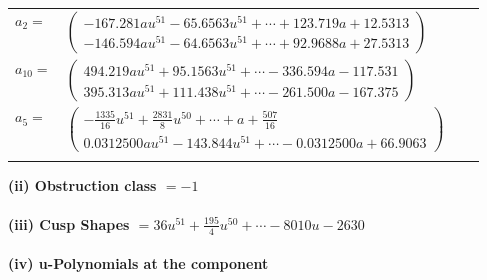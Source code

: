 \documentclass[1p]{elsarticle_modified}
\theoremstyle{definition}
\begin{document}
\begin{tabular}{m{7pt} m{180pt} m{7pt} m{180pt} }
\flushright $a_{2}=$&$\begin{pmatrix}-167.281 a u^{51}-65.6563 u^{51}+\cdots+123.719 a+12.5313\\-146.594 a u^{51}-64.6563 u^{51}+\cdots+92.9688 a+27.5313\end{pmatrix}$ \\
\flushright $a_{10}=$&$\begin{pmatrix}494.219 a u^{51}+95.1563 u^{51}+\cdots-336.594 a-117.531\\395.313 a u^{51}+111.438 u^{51}+\cdots-261.500 a-167.375\end{pmatrix}$ \\
\flushright $a_{5}=$&$\begin{pmatrix}-\frac{1335}{16} u^{51}+\frac{2831}{8} u^{50}+\cdots+a+\frac{507}{16}\\0.0312500 a u^{51}-143.844 u^{51}+\cdots-0.0312500 a+66.9063\end{pmatrix}$\\&\end{tabular}
\flushleft \textbf{(ii) Obstruction class $= -1$}\\~\\
\flushleft \textbf{(iii) Cusp Shapes $= 36 u^{51}+\frac{195}{4} u^{50}+\cdots-8010 u-2630$}\\~\\
\newpage\renewcommand{\arraystretch}{1}
\flushleft \textbf{(iv) u-Polynomials at the component}\newline \\
\end{document}
